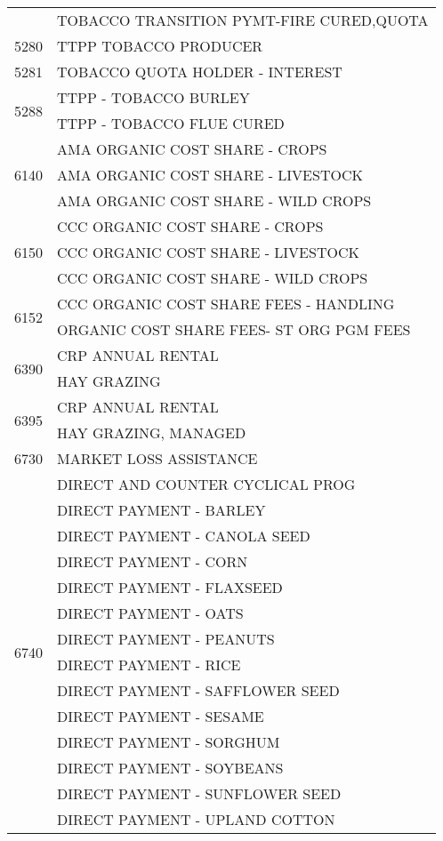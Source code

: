 \begin{longtable}{ll}
 & TOBACCO TRANSITION PYMT-FIRE CURED,QUOTA \\
\cline{1-2}
5280 & TTPP TOBACCO PRODUCER \\
\cline{1-2}
5281 & TOBACCO QUOTA HOLDER - INTEREST \\
\cline{1-2}
\multirow[t]{2}{*}{5288} & TTPP - TOBACCO BURLEY \\
 & TTPP - TOBACCO FLUE CURED \\
\cline{1-2}
\multirow[t]{3}{*}{6140} & AMA ORGANIC COST SHARE - CROPS \\
 & AMA ORGANIC COST SHARE - LIVESTOCK \\
 & AMA ORGANIC COST SHARE - WILD CROPS \\
\cline{1-2}
\multirow[t]{3}{*}{6150} & CCC ORGANIC COST SHARE - CROPS \\
 & CCC ORGANIC COST SHARE - LIVESTOCK \\
 & CCC ORGANIC COST SHARE - WILD CROPS \\
\cline{1-2}
\multirow[t]{2}{*}{6152} & CCC ORGANIC COST SHARE FEES - HANDLING \\
 & ORGANIC COST SHARE FEES- ST ORG PGM FEES \\
\cline{1-2}
\multirow[t]{2}{*}{6390} & CRP ANNUAL RENTAL \\
 & HAY GRAZING \\
\cline{1-2}
\multirow[t]{2}{*}{6395} & CRP ANNUAL RENTAL \\
 & HAY GRAZING, MANAGED \\
\cline{1-2}
6730 & MARKET LOSS ASSISTANCE \\
\cline{1-2}
\multirow[t]{15}{*}{6740} & DIRECT AND COUNTER CYCLICAL PROG \\
 & DIRECT PAYMENT - BARLEY \\
 & DIRECT PAYMENT - CANOLA SEED \\
 & DIRECT PAYMENT - CORN \\
 & DIRECT PAYMENT - FLAXSEED \\
 & DIRECT PAYMENT - OATS \\
 & DIRECT PAYMENT - PEANUTS \\
 & DIRECT PAYMENT - RICE \\
 & DIRECT PAYMENT - SAFFLOWER SEED \\
 & DIRECT PAYMENT - SESAME \\
 & DIRECT PAYMENT - SORGHUM \\
 & DIRECT PAYMENT - SOYBEANS \\
 & DIRECT PAYMENT - SUNFLOWER SEED \\
 & DIRECT PAYMENT - UPLAND COTTON \\

\end{longtable}
